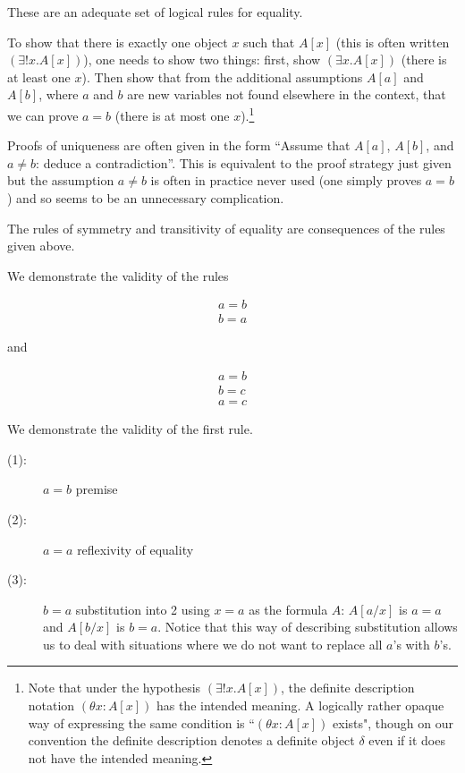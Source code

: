 \documentclass[12pt]{book}
\begin{document}
These are an adequate set of logical rules for equality.

To show that there is exactly one object $x$ such that $A[x]$ (this is
often written $(\exists! x.A[x])$), one needs to show two things:
first, show $(\exists x.A[x])$ (there is at least one $x$).  Then show
that from the additional assumptions $A[a]$ and $A[b]$, where $a$ and
$b$ are new variables not found elsewhere in the context, that we can
prove $a=b$ (there is at most one $x$).\footnote{Note that under the hypothesis $(\exists! x.A[x])$, the definite description notation $(\theta x:A[x])$ has the intended meaning.  A logically rather opaque way of expressing the same condition is ``$(\theta x:A[x])$ exists", though on our convention the definite description denotes a definite object $\delta$ even if it does not have the intended meaning.}

Proofs of uniqueness are often given in the form ``Assume that $A[a]$,
$A[b]$, and $a \neq b$: deduce a contradiction''.  This is equivalent
to the proof strategy just given but the assumption $a\neq b$ is often
in practice never used (one simply proves $a =b$) and so seems to be
an unnecessary complication.

The rules of symmetry and transitivity of equality are consequences of the rules given above.

We demonstrate the validity of the rules

$$\begin{array}{c} a=b \\ \hline b=a \end{array}$$

and

$$\begin{array}{c} a=b \\ b=c \\ \hline a=c\end{array}$$

We demonstrate the validity of the first rule.

\begin{description}

\item[(1):]  $a=b$ premise

\item[(2):]  $a=a$  reflexivity of equality

\item[(3):]  $b=a$ substitution into 2 using $x=a$ as the formula $A$:  $A[a/x]$ is $a=a$ and $A[b/x]$ is $b=a$.  Notice that this way of describing substitution allows us to deal with situations where we do not want to replace all $a$'s with $b$'s.

\end{description}
\end{document}
